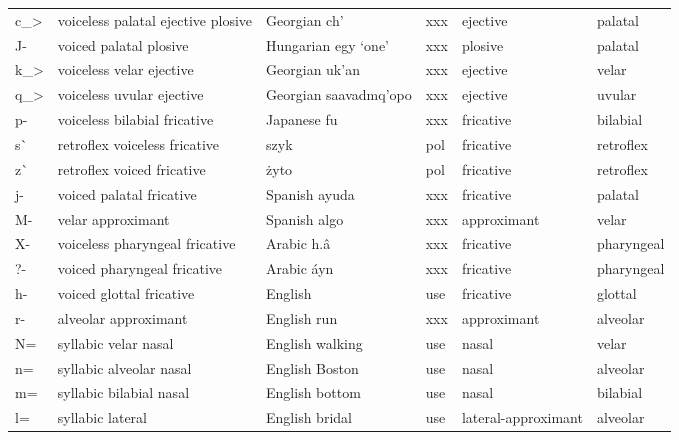 {\begin{longtable}{l|p{.3\linewidth}|p{.15\linewidth}|l|p{.15\linewidth}|l}
	c\_\textgreater{}	& voiceless palatal ejective plosive	& Georgian ch' & xxx	& ejective	& palatal	\\
	J-	& voiced palatal plosive	& Hungarian egy `one'	& xxx	& plosive	& palatal	\\
	k\_\textgreater{}	& voiceless velar ejective	& Georgian uk'an	& xxx	& ejective	& velar	\\
	q\_\textgreater{}	& voiceless uvular ejective	& Georgian saavadmq'opo	& xxx	& ejective	& uvular\\
	p-	& voiceless bilabial fricative	& Japanese fu	& xxx	& fricative	& bilabial	\\
	s\`	& retroflex voiceless fricative	& szyk	& pol	& fricative	& retroflex	\\
	z\`	& retroflex voiced fricative	& żyto	& pol	& fricative	& retroflex	\\
	j-	& voiced palatal fricative	& Spanish ayuda	& xxx	& fricative	& palatal	\\
	M-	& velar approximant	& Spanish algo	& xxx	& approximant	& velar	\\
	X-	& voiceless pharyngeal fricative	& Arabic h.\^a	& xxx	& fricative	& pharyngeal	\\
?{-}	& voiced pharyngeal fricative	& Arabic \'ayn	& xxx	& fricative	& pharyngeal	\\
	h-	& voiced glottal fricative	& English	& use	& fricative	& glottal	\\
	r-	& alveolar approximant	& English run	& xxx	& approximant	& alveolar	\\
	N=	& syllabic velar nasal	& English walking	& use	& nasal	& velar	\\
	n=	& syllabic alveolar nasal	& English Boston	& use	& nasal	& alveolar	\\
	m=	& syllabic bilabial nasal	& English bottom	& use	& nasal	& bilabial	\\
	l=	& syllabic lateral	& English bridal	& use	& lateral-approximant	& alveolar	\\
\end{longtable}
}

\newpage
